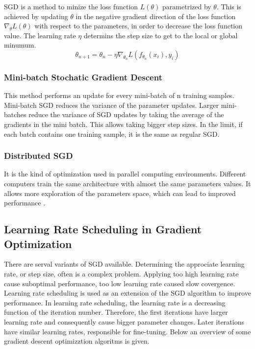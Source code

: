    SGD is a method to minize the loss function \(L(\theta)\)  parametrized by $\theta$. This is achieved by updating $\theta$ in the negative gradient direction of the loss function $\nabla_{\theta}L(\theta)$ with respect to the parameters, in order to decrease the loss function value. The learning rate $\eta$ determins the step size to get to the local or global minumum. 
    \begin{equation}
        \theta_{n+1} = \theta_{n} - \eta \nabla_{\theta_{n}}L(f_{\theta_{n}}(x_i), y_i)
    \end{equation}

    \subsubsection{Mini-batch Stochatic Gradient Descent}
    This method performs an update for every mini-batch of n training samples. Mini-batch SGD reduces the variance of the parameter updates. Larger mini-batches reduce the variance of SGD updates by taking the average of the gradients in the mini batch. This allows taking bigger step sizes. In the limit, if each batch contains one training sample, it is the same as regular SGD.

    \subsubsection{Distributed SGD}
    It is the kind of optimization used in parallel computing environments. Different computers train the same architecture with almost the same parameters values. It allows more exploration of the parameters space, which can lead to improved performance \cite{zhang2015deep}.

    \subsection{Learning Rate Scheduling in Gradient Optimization}
    There are serval variants of SGD available. Determining the approciate learning rate, or step size, often is a complex problem. Applying too high learning rate cause suboptimal performance, too low learning rate caused slow covergence. Learning rate scheduling is used as an extension of the SGD algorithm to improve performance. In learning rate scheduling, the learning rate is a decreasing function of the iteration number. Therefore, the first iterations have larger learning rate and consequently cause bigger parameter changes. Later iterations have similar learning rates, responsible for fine-tuning. Below an overview of some gradient descent optimizztion algoritms is given.

